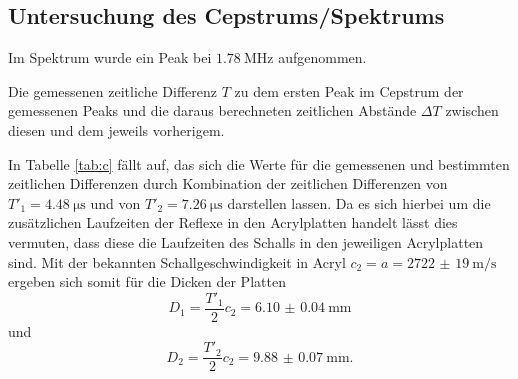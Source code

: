 \subsection{Untersuchung des Cepstrums/Spektrums}
Im Spektrum wurde ein Peak bei $\SI{1.78}{\mega\hertz}$ aufgenommen.
\begin{table}
	\centering
	\caption{Die gemessenen zeitliche Differenz $T$ zu dem ersten Peak im Cepstrum der gemessenen Peaks und die daraus berechneten zeitlichen Abstände $\Delta T$ zwischen diesen und dem jeweils vorherigem.}
	
\end{table}
In Tabelle \ref{tab:c} fällt auf, das sich die Werte für die gemessenen und bestimmten zeitlichen Differenzen durch Kombination der zeitlichen Differenzen von $T'_1=\SI{4.48}{\micro\second}$ und von $T'_2=\SI{7.26}{\micro\second}$ darstellen lassen. Da es sich hierbei um die zusätzlichen Laufzeiten der Reflexe in den Acrylplatten handelt lässt dies vermuten, dass diese die Laufzeiten des Schalls in den jeweiligen Acrylplatten sind.
Mit der bekannten Schallgeschwindigkeit in Acryl $c_2=a=\SI{2722(19)}{\meter\per\second}$ ergeben sich somit für die Dicken der Platten
\begin{equation}
D_1=\frac{T'_1}{2} c_2=\SI{6.10(4)}{\milli\meter}
\end{equation}
und
\begin{equation}
D_2=\frac{T'_2}{2} c_2=\SI{9.88(7)}{\milli\meter}\text{.}
\end{equation}


